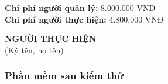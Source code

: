 {\begin{minipage}{\textwidth}
    \noindent \textbf{Chi phí người quản lý:} 8.000.000 VNĐ \\
    \noindent \textbf{Chi phí người thực hiện:} 4.800.000 VNĐ \\
    \vspace{1cm}
    \begin{flushleft}
        \hspace{8cm} \textbf{NGƯỜI THỰC HIỆN} \\
        \hspace{8.8cm} (Ký tên, họ tên) \\
        \vspace{1cm}
    \end{flushleft}
    \end{minipage}
}
% 
\subsubsection{Phần mềm sau kiểm thử}
